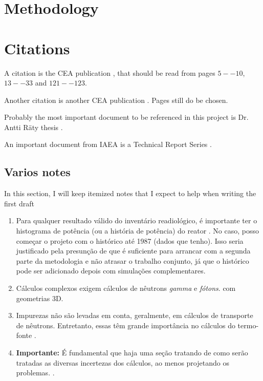 \documentclass[11pt]{article} %
\begin{document}
\section{Methodology}

\section{Citations}

A citation is the CEA publication \cite{Clean-up_CEA-e-DEN_2018}, that should be read from pages $5--10$, $13--33$ and $121--123$.

Another citation is another CEA publication \cite{Neutronics_CEA-e-DEN_2015}. Pages still do be chosen.

Probably the most important document to be referenced in this project is Dr. Antti R{\"a}ty thesis \cite{Raty_Thesis_2020}. 

An important document from IAEA is a Technical Report Series \cite{IAEA_TRS_494_2024}.

\subsection{Varios notes}

In this section, I will keep itemized notes that I expect to help when writing the first draft

\begin{enumerate}
\item Para qualquer resultado válido do inventário readiológico, é importante ter o histograma de potência (ou a história de potência) do reator \cite[p.~21]{Clean-up_CEA-e-DEN_2018}. No caso, posso começar o projeto com o histórico até 1987 (dados que tenho). Isso seria justificado pela presunção de que é suficiente para arrancar com a segunda parte da metodologia e não atrasar o trabalho conjunto, já que o histórico pode ser adicionado depois com simulações complementares.
\item Cálculos complexos exigem cálculos de nêutrons \textit{gamma} e \textit{fótons}.\cite[p.~22]{Clean-up_CEA-e-DEN_2018} com geometrias 3D.
\item Impurezas não são levadas em conta, geralmente, em cálculos de transporte de nêutrons. Entretanto, essas têm grande importância no cálculos do termo-fonte \cite[p.~24]{Clean-up_CEA-e-DEN_2018}.
  \item \textbf{Importante:} É fundamental que haja uma seção tratando de como serão tratadas as diversas incertezas dos cálculos, ao menos projetando os problemas. \cite[p.~165-170]{Neutronics_CEA-e-DEN_2015}.
\end{enumerate}


\end{document}
